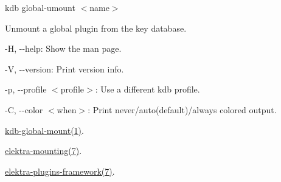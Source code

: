 {\ttfamily kdb global-\/umount $<$name$>$}

Unmount a global plugin from the key database.


\begin{DoxyItemize}
\item {\ttfamily -\/H}, {\ttfamily -\/-\/help}\+: Show the man page.
\item {\ttfamily -\/V}, {\ttfamily -\/-\/version}\+: Print version info.
\item {\ttfamily -\/p}, {\ttfamily -\/-\/profile $<$profile$>$}\+: Use a different kdb profile.
\item {\ttfamily -\/C}, {\ttfamily -\/-\/color $<$when$>$}\+: Print never/auto(default)/always colored output.
\end{DoxyItemize}


\begin{DoxyCode}{0}
\DoxyCodeLine{}
\DoxyCodeLine{}
\DoxyCodeLine{}
\DoxyCodeLine{}
\DoxyCodeLine{}
\DoxyCodeLine{}
\DoxyCodeLine{\#>}
\end{DoxyCode}



\begin{DoxyItemize}
\item \mbox{\hyperlink{doc_help_kdb-global-mount_md}{kdb-\/global-\/mount(1)}}.
\item \mbox{\hyperlink{doc_help_elektra-mounting_md}{elektra-\/mounting(7)}}.
\item \mbox{\hyperlink{doc_dev_plugins-framework_md}{elektra-\/plugins-\/framework(7)}}. 
\end{DoxyItemize}